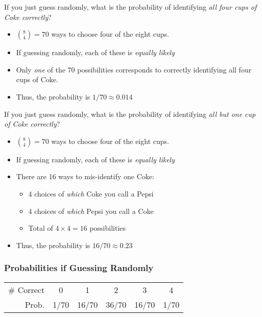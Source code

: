 \documentclass{beamer}
\begin{document}
\begin{frame}
If you just guess randomly, what is the probability of identifying \emph{all four cups of Coke correctly}?
\pause
\begin{itemize}
\item ${8\choose 4}=70$ ways to choose four of the eight cups. \pause
\item If guessing randomly, each of these is \emph{\alert{equally likely}} \pause
\item Only \emph{\alert{one}} of the 70 possibilities corresponds to correctly identifying all four cups of Coke. \pause
\item Thus, the probability is $1/70 \approx 0.014$
\end{itemize}
\end{frame}
\begin{frame}
If you just guess randomly, what is the probability of identifying \emph{all but one cup of Coke correctly}?
\pause
\begin{itemize}
\item ${8\choose 4}=70$ ways to choose four of the eight cups. \pause
\item If guessing randomly, each of these is \emph{\alert{equally likely}} \pause
\item There are 16 ways to mis-identify one Coke: 
	\begin{itemize}
		\item $4$ choices of \emph{which} Coke you call a Pepsi 
		\item $4$ choices of \emph{which} Pepsi you call a Coke 
		\item Total of $4\times 4 = 16$ possibilities \pause
	\end{itemize}	
\item Thus, the probability is $16/70 \approx 0.23$
\end{itemize}
\end{frame}
\begin{frame}
\frametitle{Probabilities if Guessing Randomly}
	\begin{center}
		\begin{tabular}{rccccc}
		\hline
		\# Correct & 0 & 1 & 2 & 3 & 4\\
		Prob.&1/70 & 16/70 & 36/70 & 16/70 &1/70\\
		\hline
		\end{tabular}
	\end{center}
\end{frame}
\end{document}
